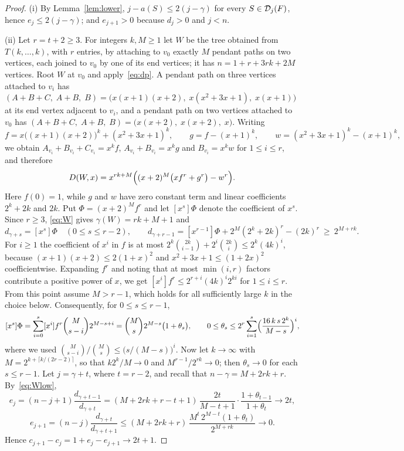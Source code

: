 \begin{proof}
(i) By Lemma~\ref{lem:lower}, $j-a(S)\le2(j-\gamma)$ for every
$S\in\mathcal{D}_j(F)$, hence $e_j\le2(j-\gamma)$; and $e_{j+1}>0$ because $d_j>0$
and $j<n$.

(ii) Let $r=t+2\ge3$. For integers $k,M\ge1$ let $W$ be the tree obtained from
$T(k,\dots,k)$, with $r$ entries, by attaching to $v_0$ exactly $M$ pendant
paths on two vertices, each joined to $v_0$ by one of its end vertices; it
has $n=1+r+3rk+2M$ vertices. Root $W$ at $v_0$ and
apply~\eqref{eq:dp}. A pendant path on three vertices attached to
$v_i$ has $(A+B+C,\;A+B,\;B)=\bigl(x(x+1)(x+2),\;x(x^2+3x+1),\;x(x+1)\bigr)$
at its end vertex adjacent to $v_i$, and a pendant path on two vertices
attached to $v_0$ has $(A+B+C,\;A+B,\;B)=\bigl(x(x+2),\;x(x+2),\;x\bigr)$.
Writing
\[
  f=x\bigl((x+1)(x+2)\bigr)^k+(x^2+3x+1)^k,\qquad g=f-(x+1)^k,\qquad
  w=(x^2+3x+1)^k-(x+1)^k ,
\]
we obtain $A_{v_i}+B_{v_i}+C_{v_i}=x^kf$, $A_{v_i}+B_{v_i}=x^kg$ and
$B_{v_i}=x^kw$ for $1\le i\le r$, and therefore
\begin{equation}\label{eq:W}
  D(W,x)=x^{rk+M}\Bigl((x+2)^M\bigl(xf^r+g^r\bigr)-w^r\Bigr).
\end{equation}
Here $f(0)=1$, while $g$ and $w$ have zero constant term and linear
coefficients $2^k+2k$ and $2k$. Put $\Phi=(x+2)^Mf^r$ and let $[x^s]\Phi$
denote the coefficient of $x^s$. Since $r\ge3$, \eqref{eq:W} gives
$\gamma(W)=rk+M+1$ and
\begin{equation}\label{eq:Wlow}
  d_{\gamma+s}=[x^s]\Phi\quad(0\le s\le r-2),\qquad
  d_{\gamma+r-1}=[x^{r-1}]\Phi+2^M(2^k+2k)^r-(2k)^r\ \ge\ 2^{M+rk}.
\end{equation}
For $i\ge1$ the coefficient of $x^i$ in $f$ is at most
$2^k\binom{2k}{i-1}+2^i\binom{2k}{i}\le2^k(4k)^i$, because
$(x+1)(x+2)\le2(1+x)^2$ and $x^2+3x+1\le(1+2x)^2$ coefficientwise. Expanding
$f^r$ and noting that at most $\min(i,r)$ factors contribute a positive power
of $x$, we get $[x^i]f^r\le2^{r+i}(4k)^i2^{ki}$ for $1\le i\le r$. From this point assume $M>r-1$, which holds for all sufficiently large $k$
in the choice below. Consequently, for $0\le s\le r-1$,
\[
  [x^s]\Phi=\sum_{i=0}^{s}[x^i]f^r\binom{M}{s-i}2^{M-s+i}
  =\binom Ms2^{M-s}\bigl(1+\theta_s\bigr),\qquad
  0\le\theta_s\le2^r\sum_{i=1}^{s}\Bigl(\frac{16\,k\,s\,2^k}{M-s}\Bigr)^{i},
\]
where we used $\binom{M}{s-i}\big/\binom Ms\le\bigl(s/(M-s)\bigr)^i$. Now let
$k\to\infty$ with $M=2^{k+\lceil k/(2r-2)\rceil}$, so that $k2^k/M\to0$ and
$M^{r-1}/2^{rk}\to0$; then $\theta_s\to0$ for each $s\le r-1$. Let $j=\gamma+t$,
where $t=r-2$, and recall that $n-\gamma=M+2rk+r$. By~\eqref{eq:Wlow},
\[
  e_j=(n-j+1)\frac{d_{\gamma+t-1}}{d_{\gamma+t}}
     =(M+2rk+r-t+1)\,\frac{2t}{M-t+1}\cdot\frac{1+\theta_{t-1}}{1+\theta_t}
     \longrightarrow2t ,
\]
\[
  e_{j+1}=(n-j)\frac{d_{\gamma+t}}{d_{\gamma+t+1}}
     \le(M+2rk+r)\,\frac{M^{t}\,2^{M-t}(1+\theta_t)}{2^{M+rk}}
     \longrightarrow0 .
\]
Hence $c_{j+1}-c_j=1+e_j-e_{j+1}\to2t+1$.
\end{proof}


